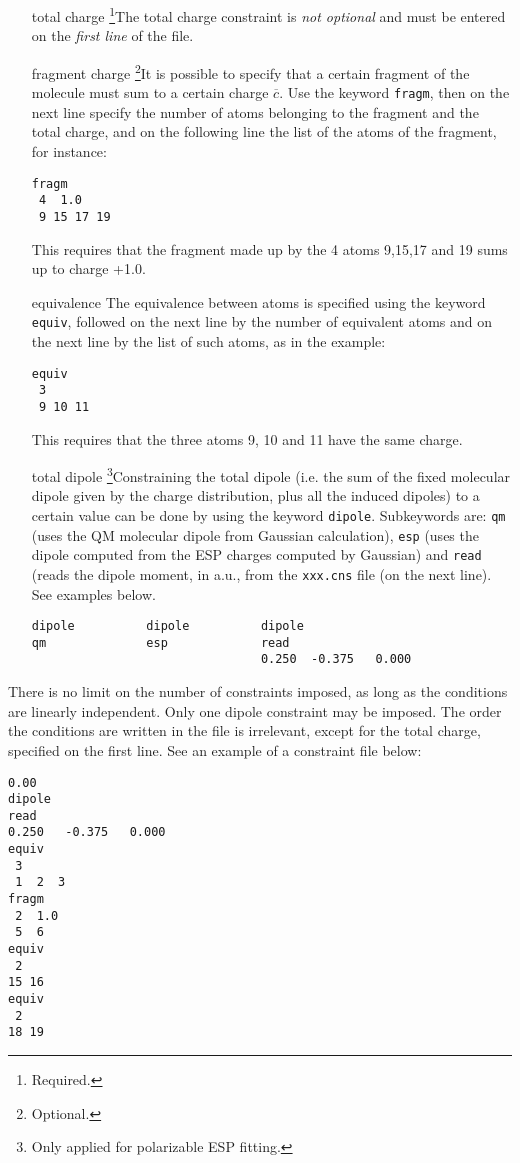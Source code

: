\documentclass[a4paper]{report}
\makeatletter
\newcommand\footnoteref[1]{\protected@xdef\@thefnmark{\ref{#1}}\@footnotemark}
\makeatother
\begin{document}
\begin{itemize}
\item[total charge] \footnote{Required.}The total charge constraint is \emph{not optional} and must be
entered on the \emph{first line} of the file.
\item[fragment charge] \footnote{\label{N:opt}Optional.}It is possible to specify that
a certain fragment of the molecule must sum to a certain charge $\overline{c}$. Use
the keyword \texttt{fragm}, then on the next line specify the number of atoms
belonging to the fragment and the total charge, and on the following line the list of
the atoms of the fragment, for instance:
\begin{verbatim}
fragm
 4  1.0
 9 15 17 19
\end{verbatim}
This requires that the fragment made up by the 4 atoms 9,15,17 and 19 sums up to
charge +1.0.
\item[equivalence] \footnoteref{N:opt}The equivalence between atoms is
specified using the keyword \texttt{equiv}, followed on the next line by the number
of equivalent atoms and on the next line by the list of such atoms, as in the
example:
\begin{verbatim}
equiv
 3
 9 10 11
\end{verbatim}
This requires that the three atoms 9, 10 and 11 have the same charge.
\item[total dipole] \footnoteref{N:opt}\footnote{Only applied for polarizable
ESP fitting.}Constraining the total dipole (i.e. the sum of the fixed
molecular dipole given by the charge distribution, plus all the induced dipoles) to a
certain value can be done by using the keyword \texttt{dipole}. Subkeywords are:
\texttt{qm} (uses the QM molecular dipole from Gaussian calculation), \texttt{esp}
(uses the dipole computed from the ESP charges computed by Gaussian) and
\texttt{read} (reads the dipole moment, in a.u., from the \texttt{xxx.cns} file (on
the next line). See examples below.
\begin{verbatim}
dipole          dipole          dipole        
qm              esp             read
                                0.250  -0.375   0.000
\end{verbatim}
\end{itemize}

There is no limit on the number of constraints imposed, as long as the conditions are
linearly independent. Only one dipole constraint may be imposed. The order the
conditions are written in the file is irrelevant, except for the total charge,
specified on the first line. See an example of a constraint file below:
\begin{verbatim}
0.00
dipole
read
0.250   -0.375   0.000
equiv
 3
 1  2  3
fragm
 2  1.0
 5  6
equiv
 2
15 16
equiv
 2
18 19
\end{verbatim}
\end{document}

